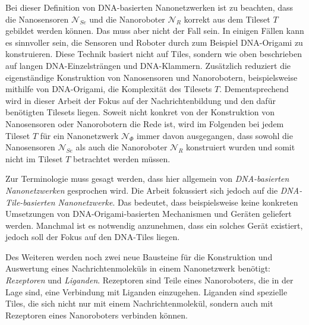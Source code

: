 Bei dieser Definition von DNA-basierten Nanonetzwerken ist zu beachten, dass die Nanosensoren $\mathcal{N}_{Se}$ und die Nanoroboter $\mathcal{N}_R$ korrekt aus dem Tileset $T$ gebildet werden können. 
Das muss aber nicht der Fall sein. 
In einigen Fällen kann es sinnvoller sein, die Sensoren und Roboter durch zum Beispiel DNA-Origami zu konstruieren. 
Diese Technik basiert nicht auf Tiles, sondern wie oben beschrieben auf langen DNA-Einzelsträngen und DNA-Klammern. 
Zusätzlich reduziert die eigenständige Konstruktion von Nanosensoren und Nanorobotern, beispielsweise mithilfe von DNA-Origami, die Komplexität des Tilesets $T$. 
Dementsprechend wird in dieser Arbeit der Fokus auf der Nachrichtenbildung und den dafür benötigten Tilesets liegen. 
Soweit nicht konkret von der Konstruktion von Nanosensoren oder Nanorobotern die Rede ist, wird im Folgenden bei jedem Tileset $T$ für ein Nanonetzwerk $\mathcal{N}_\Phi$ immer davon ausgegangen, dass sowohl die Nanosensoren $\mathcal{N}_{Se}$ als auch die Nanoroboter $\mathcal{N}_R$ konstruiert wurden und somit nicht im Tileset $T$ betrachtet werden müssen.

Zur Terminologie muss gesagt werden, dass hier allgemein von \emph{DNA-basierten Nanonetzwerken} gesprochen wird. Die Arbeit fokussiert sich jedoch auf die \emph{DNA-Tile-basierten Nanonetzwerke}. Das bedeutet, dass beispielsweise keine konkreten Umsetzungen von DNA-Origami-basierten Mechanismen und Geräten geliefert werden. Manchmal ist es notwendig anzunehmen, dass ein solches Gerät existiert, jedoch soll der Fokus auf den DNA-Tiles liegen.

Des Weiteren werden noch zwei neue Bausteine für die Konstruktion und Auswertung eines Nachrichtenmoleküls in einem Nanonetzwerk benötigt: \emph{Rezeptoren} und \emph{Liganden}.
Rezeptoren sind Teile eines Nanoroboters, die in der Lage sind, eine Verbindung mit Liganden einzugehen.
Liganden sind spezielle Tiles, die sich nicht nur mit einem Nachrichtenmolekül, sondern auch mit Rezeptoren eines Nanoroboters verbinden können.

